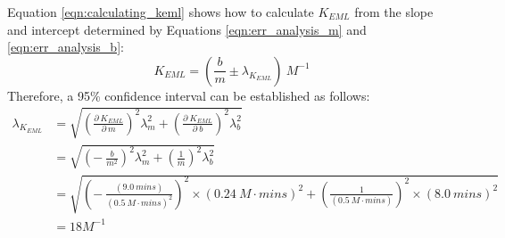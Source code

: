 Equation \eqref{eqn:calculating_keml} shows how to calculate $K_{EML}$ from the slope and intercept determined by Equations \eqref{eqn:err_analysis_m} and \eqref{eqn:err_analysis_b}:
\begin{equation*}
K_{EML}=\left (\frac{b}{m}\pm\lambda_{K_{EML}}\right ){\ }M^{-1}
\end{equation*}
Therefore, a 95\% confidence interval can be established as follows:
\begin{equation*}
\begin{split}
\lambda_{K_{EML}}&=\sqrt{\left (\frac{\partial{\ }K_{EML}}{\partial{\ }m}\right )^{2}\lambda_{m}^{2}+\left (\frac{\partial{\ }K_{EML}}{\partial{\ }b}\right )^{2}\lambda_{b}^{2}} \\
&=\sqrt{\left (-{\ }\frac{b}{m^{2}}\right )^{2}\lambda_{m}^{2}+\left (\frac{1}{m}\right )^{2}\lambda_{b}^{2}} \\
&=\sqrt{\left (-{\ }\frac{\left (9.0{\ }mins\right )}{\left (0.5{\ }M\cdot{mins}\right )^{2}}\right )^2\times\left (0.24{\ }M\cdot{mins}\right )^2+\left (\frac{1}{\left (0.5{\ }M\cdot{mins}\right )}\right )^2\times\left (8.0{\ }mins\right )^2} \\
&=18M^{-1}
 \end{split}
\end{equation*}